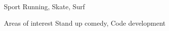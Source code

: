 
\begin{cvskills}

  \cvskill
    {Sport} %
    {Running, Skate, Surf} %
    
  \cvskill
    {Areas of interest} %
    {Stand up comedy, Code development} %
    
\end{cvskills}